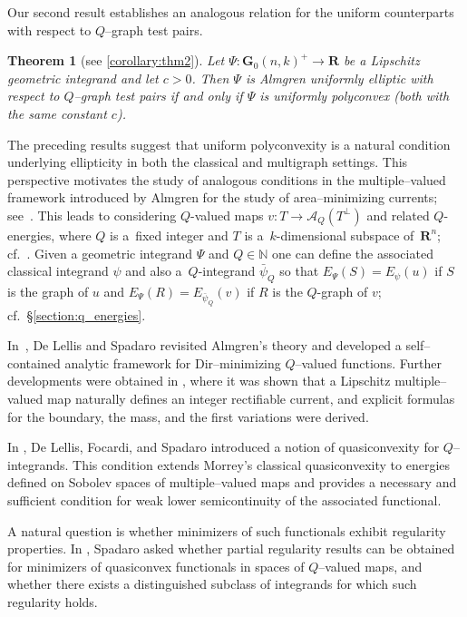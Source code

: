 \documentclass[a4paper,twoside,reqno]{article}
\theoremstyle{definition}
\theoremstyle{remark}
\theoremstyle{plain}
\newtheorem*{theorem*}{Theorem}
\theoremstyle{remark}
\theoremstyle{definition}
\newcommand{\ograss}[2]{\mathbf{G}_0(#1,#2)}
\newcommand{\natp}{\mathbb{N}}
\newcommand{\R}{\mathbf{R}}
\newcommand{\qspace}[1]{\mathcal{A}_{{#1}}}
\begin{document}
Our second result establishes an analogous relation for the uniform counterparts
with respect to $Q$--graph test pairs.

\begin{theorem*}[see \ref{corollary:thm2}]
    Let $\Psi : \ograss{n}{k}^{+} \to \R$ be a Lipschitz geometric integrand and
    let $c>0$. Then $\Psi$ is Almgren uniformly elliptic with respect to
    $Q$--graph test pairs if and only if $\Psi$ is uniformly polyconvex (both
    with the same constant $c$).
\end{theorem*}
The preceding results suggest that uniform polyconvexity is a natural condition 
underlying ellipticity in both the classical and multigraph settings.
This perspective motivates the study of analogous conditions in the
multiple--valued framework introduced by Almgren for the study of
area--minimizing currents; see~\cite{Almgren2000e}. This leads to considering
$Q$-valued maps $v : T \to \qspace{Q}(T^{\perp})$ and related $Q$-energies,
where $Q$ is a~fixed integer and $T$ is a~$k$-dimensional subspace of~$\R^n$;
cf.~\cite{Almgren2000e, De_Lellis_2011_Q_valued_functions_revisited,
  delellis2013multiplevaluedfunctionsintegral}. Given a geometric integrand
$\Psi$ and $Q \in \natp$ one can define the associated classical integrand
$\psi$ and also a~$Q$-integrand $\bar{\psi}_Q$ so that
$E_{\Psi}(S) = E_{\psi}(u)$ if $S$ is the graph of $u$ and
$E_{\Psi}(R) = E_{\bar{\psi}_Q}(v)$ if $R$ is the $Q$-graph of $v$;
cf.~\S{\ref{section:q_energies}}.

In~\cite{De_Lellis_2011_Q_valued_functions_revisited}, De Lellis and Spadaro
revisited Almgren's theory and developed a self--contained analytic framework
for Dir--minimizing $Q$--valued functions. Further developments were obtained in
\cite{delellis2013multiplevaluedfunctionsintegral}, where it was shown that a
Lipschitz multiple--valued map naturally defines an integer rectifiable current,
and explicit formulas for the boundary, the mass, and the first variations were
derived.

In \cite{DeLellis2011a}, De Lellis, Focardi, and Spadaro introduced a notion of
quasiconvexity for $Q$--integrands. This condition extends Morrey's classical
quasiconvexity to energies defined on Sobolev spaces of multiple--valued maps
and provides a necessary and sufficient condition for weak lower semicontinuity
of the associated functional.

A natural question is whether minimizers of such functionals exhibit regularity
properties. In \cite{Spadaro2015}, Spadaro asked whether partial regularity
results can be obtained for minimizers of quasiconvex functionals in spaces of
$Q$--valued maps, and whether there exists a distinguished subclass of
integrands for which such regularity holds.
\end{document}
